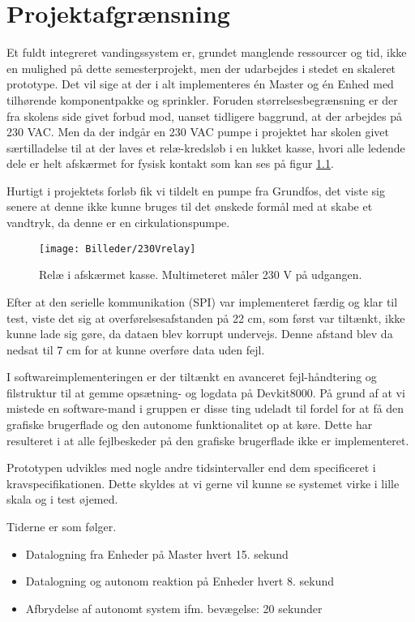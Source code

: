 \chapter{Projektafgrænsning}

Et fuldt integreret vandingssystem er, grundet manglende ressourcer og tid, ikke en mulighed på dette semesterprojekt, men der udarbejdes i stedet en skaleret prototype. Det vil sige at der i alt implementeres én Master og én Enhed med tilhørende komponentpakke og sprinkler. 
Foruden størrelsesbegrænsning er der fra skolens side givet forbud mod, uanset tidligere baggrund, at der arbejdes på 230 VAC. Men da der indgår en 230 VAC pumpe i projektet har skolen givet særtilladelse til at der laves et relæ-kredsløb i en lukket kasse, hvori alle ledende dele er helt afskærmet for fysisk kontakt som kan ses på figur \ref{lab:230Vrelay}.

Hurtigt i projektets forløb fik vi tildelt en pumpe fra Grundfos, det viste sig senere at denne ikke kunne bruges til det ønskede formål med at skabe et vandtryk, da denne er en cirkulationspumpe. 


\begin{figure}[H]
  \centering
    \texttt{[image: Billeder/230Vrelay]}
    \caption{Relæ i afskærmet kasse. Multimeteret måler 230 V på udgangen.}
    \label{lab:230Vrelay}
\end{figure}

Efter at den serielle kommunikation (SPI) var implementeret færdig og klar til test, viste det sig at overførelsesafstanden på 22 cm, som først var tiltænkt, ikke kunne lade sig gøre, da dataen blev korrupt undervejs. Denne afstand blev da nedsat til 7 cm for at kunne overføre data uden fejl.
 
I softwareimplementeringen er der tiltænkt en  avanceret fejl-håndtering og filstruktur til at gemme opsætning- og logdata på Devkit8000. På grund af at vi mistede en software-mand i gruppen er disse ting udeladt til fordel for at få den grafiske brugerflade og den autonome funktionalitet op at køre. Dette har resulteret i at alle fejlbeskeder på den grafiske brugerflade ikke er implementeret.

Prototypen udvikles med nogle andre tidsintervaller end dem specificeret i kravspecifikationen. Dette skyldes at vi gerne vil kunne se systemet virke i lille skala og i test øjemed.

\newpage

Tiderne er som følger.

\begin{itemize}
	\item Datalogning fra Enheder på Master hvert 15. sekund
	\item Datalogning og autonom reaktion på Enheder hvert 8. sekund
	\item Afbrydelse af autonomt system ifm. bevægelse: 20 sekunder
\end{itemize}